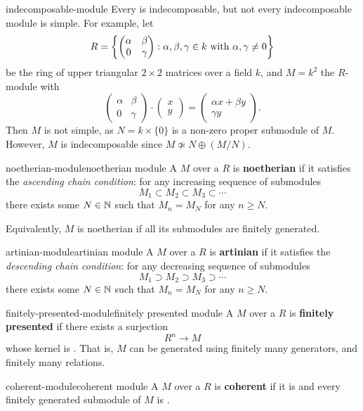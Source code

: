 \begin{example}{indecomposable-module}
    Every  is indecomposable, but not every indecomposable module is simple. For example, let
    \[ R = \left\{ \begin{pmatrix} \alpha & \beta \\ 0 & \gamma \end{pmatrix} : \alpha, \beta, \gamma \in k \textup{ with } \alpha, \gamma \ne 0 \right\} \]
    be the ring of upper triangular $2 \times 2$ matrices over a field $k$, and $M = k^2$ the $R$-module with
    \[ \begin{pmatrix} \alpha & \beta \\ 0 & \gamma \end{pmatrix} \cdot \begin{pmatrix} x \\ y \end{pmatrix} = \begin{pmatrix} \alpha x + \beta y \\ \gamma y \end{pmatrix} . \]
    Then $M$ is not simple, as $N = k \times \{ 0 \}$ is a non-zero proper submodule of $M$. However, $M$ is indecomposable since $M \not\simeq N \oplus (M / N)$.
\end{example}

\begin{topic}{noetherian-module}{noetherian module}
    A  $M$ over a  $R$ is \textbf{noetherian} if it satisfies the \textit{ascending chain condition}: for any increasing sequence of submodules
    \[ M_1 \subset M_2 \subset M_3 \subset \cdots \]
    there exists some $N \in \mathbb{N}$ such that $M_n = M_N$ for any $n \ge N$.
    
    Equivalently, $M$ is noetherian if all its submodules are finitely generated.
\end{topic}

\begin{topic}{artinian-module}{artinian module}
    A  $M$ over a  $R$ is \textbf{artinian} if it satisfies the \textit{descending chain condition}: for any decreasing sequence of submodules
    \[ M_1 \supset M_2 \supset M_3 \supset \cdots \]
    there exists some $N \in \mathbb{N}$ such that $M_n = M_N$ for any $n \ge N$.
\end{topic}

\begin{topic}{finitely-presented-module}{finitely presented module}
    A  $M$ over a  $R$ is \textbf{finitely presented} if there exists a surjection
    \[ R^n \to M \]
    whose kernel is . That is, $M$ can be generated using finitely many generators, and finitely many relations.
\end{topic}

\begin{topic}{coherent-module}{coherent module}
    A  $M$ over a  $R$ is \textbf{coherent} if it is  and every finitely generated submodule of $M$ is .
\end{topic}
